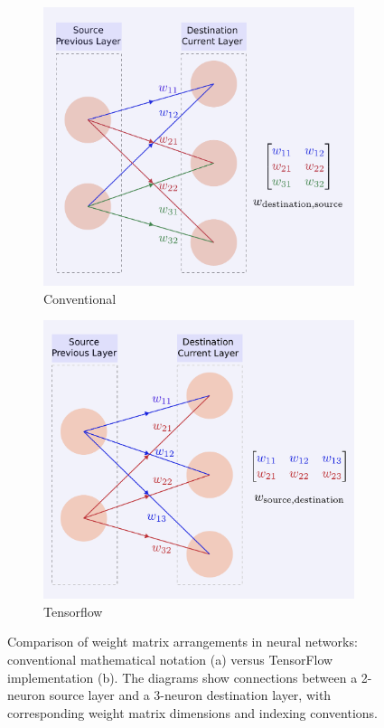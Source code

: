 \documentclass{article}
\begin{document}
\begin{figure}[ht]
\begin{subfigure}{.5\textwidth}
  \centering
  \includegraphics[width=.9\linewidth]{nn_keras.pdf}  
  \caption{Conventional}
  \label{fig:conv}
\end{subfigure}
\begin{subfigure}{.5\textwidth}
  \centering
  \includegraphics[width=.9\linewidth]{nn.pdf}  
  \caption{Tensorflow}
  \label{fig:tf}
\end{subfigure}
\caption{Comparison of weight matrix arrangements in neural networks: conventional mathematical notation (a) versus TensorFlow implementation (b). The diagrams show connections between a 2-neuron source layer and a 3-neuron destination layer, with corresponding weight matrix dimensions and indexing conventions.}
\label{fig:wmat}
\end{figure}
\end{document}
